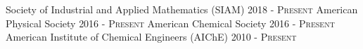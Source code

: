 \begin{cvhonors}[1.5cm]
  \cvhonor
    {} %
    {Society of Industrial and Applied Mathematics (SIAM)} %
    {} %
    {2018 - \textsc{Present}} %
  \cvhonor
    {} %
    {American Physical Society} %
    {} %
    {2016 - \textsc{Present}} %
  \cvhonor
    {} %
    {American Chemical Society} %
    {} %
    {2016 - \textsc{Present}} %
  \cvhonor
    {} %
    {American Institute of Chemical Engineers (AIC\textnormal{h}E)} %
    {} %
    {2010 - \textsc{Present}} %
\end{cvhonors}
